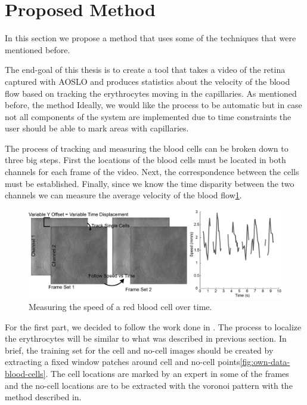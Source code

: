 \documentclass[]{article}
\begin{document}
\section{Proposed Method} 
In this section we propose a method that uses some of the techniques that were mentioned before.

The end-goal of this thesis is to create a tool that takes a video of the retina
captured with AOSLO and produces statistics about the velocity of the blood flow 
based on tracking the erythrocytes moving in the capillaries.
As mentioned before, the method 
Ideally, we would like the process to be automatic but in case not all components
of the system are implemented due to time constraints the user should be able
to mark areas with capillaries.

The process of tracking and measuring the blood cells can be broken down to three 
big steps.
First the locations of the blood cells must be located in both channels for each frame of the video.
Next, the correspondence between the cells must be established.
Finally, since we know the time disparity between the two channels we can measure the average velocity of the blood flow\ref{fig:speed-of-cell-over-time}.

\begin{figure}[ht]
	\centering
	\includegraphics[width=\textwidth]{spatial_offset.png}
	\caption{Measuring the speed of a red blood cell over time.}
	\label{fig:speed-of-cell-over-time}
\end{figure}

For the first part, we decided to follow the work done in \cite{cunefare_open_2017}.
The process to localize the erythrocytes will be similar to what was described 
in previous section.
In brief, the training set for the cell and no-cell images should be created by 
extracting a fixed window patches around cell and no-cell points\ref{fig:own-data-blood-cells}.
The cell locations are marked by an expert in some of the frames and the no-cell
locations are to be extracted with the voronoi pattern with the method described
in\cite{cunefare_open_2017}.
\end{document}
